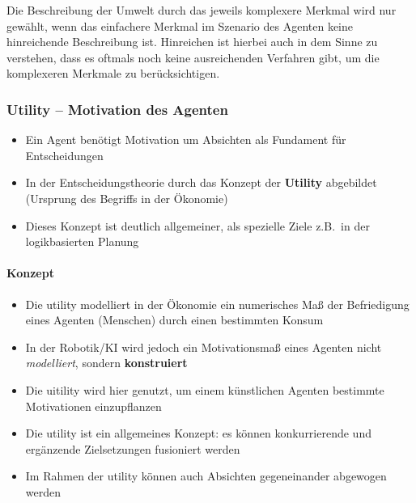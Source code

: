 Die Beschreibung der Umwelt durch das jeweils komplexere Merkmal wird nur gewählt, wenn das einfachere Merkmal im Szenario des Agenten keine hinreichende Beschreibung ist.
Hinreichen ist hierbei auch in dem Sinne zu verstehen, dass es oftmals noch keine ausreichenden Verfahren gibt, um die komplexeren Merkmale zu berücksichtigen.

\subsubsection{Utility -- Motivation des Agenten}
\begin{itemize}
	\item Ein Agent benötigt Motivation um Absichten als Fundament für Entscheidungen
	\item In der Entscheidungstheorie durch das Konzept der \textbf{Utility} abgebildet (Ursprung des Begriffs in der Ökonomie)
	\item Dieses Konzept ist deutlich allgemeiner, als spezielle Ziele z.B.\ in der logikbasierten Planung	
\end{itemize}

\paragraph{Konzept}
\begin{itemize}
	\item Die utility modelliert in der Ökonomie ein numerisches Maß der Befriedigung eines Agenten (Menschen) durch einen bestimmten Konsum
	\item In der Robotik/KI wird jedoch ein Motivationsmaß eines Agenten nicht \emph{modelliert}, sondern \textbf{konstruiert}
	\item Die uitility wird hier genutzt, um einem künstlichen Agenten bestimmte Motivationen einzupflanzen
	\item Die utility ist ein allgemeines Konzept: es können konkurrierende und ergänzende Zielsetzungen fusioniert werden
	\item Im Rahmen der utility können auch Absichten gegeneinander abgewogen werden
\end{itemize}